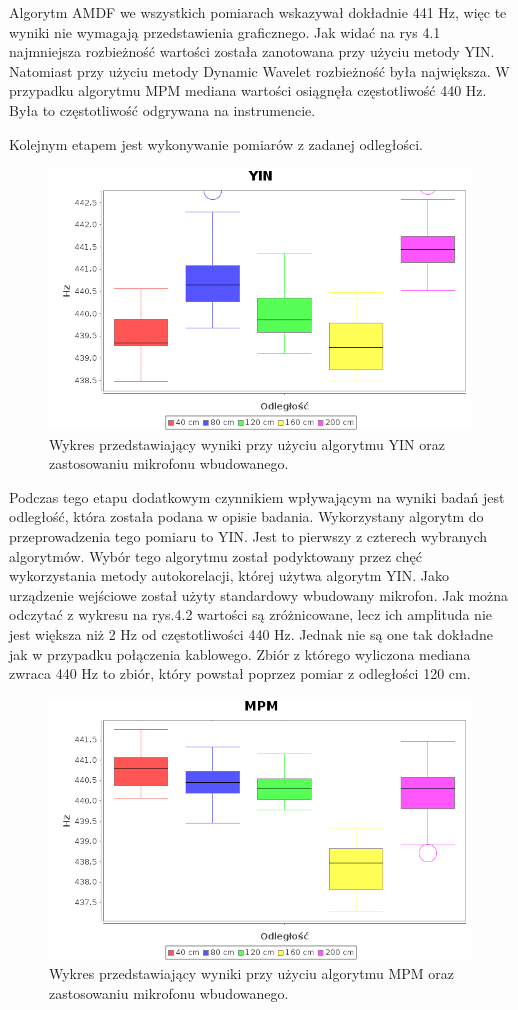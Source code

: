 Algorytm AMDF we wszystkich pomiarach wskazywał dokładnie 441 Hz, więc te wyniki nie wymagają przedstawienia graficznego. Jak widać na rys 4.1 najmniejsza rozbieżność wartości została zanotowana przy użyciu metody YIN. Natomiast przy użyciu metody Dynamic Wavelet rozbieżność była największa. W przypadku algorytmu MPM mediana wartości osiągnęła częstotliwość 440 Hz. Była to częstotliwość odgrywana na instrumencie.
 
 \newpage
Kolejnym etapem jest wykonywanie pomiarów z zadanej odległości.


\begin{figure}[h!]
  \centering
  \includegraphics[width=0.5\linewidth]{rys/BoxPlots/YIN_mic_wb}
  \caption{Wykres przedstawiający wyniki przy użyciu algorytmu YIN oraz zastosowaniu mikrofonu wbudowanego.}
  \label{fig:schemat}
\end{figure}


Podczas tego etapu dodatkowym czynnikiem wpływającym na wyniki badań jest odległość, która została podana w opisie badania. Wykorzystany algorytm do przeprowadzenia tego pomiaru to YIN. Jest to pierwszy z czterech wybranych algorytmów. Wybór tego algorytmu został podyktowany przez chęć wykorzystania metody autokorelacji, której użytwa algorytm YIN. Jako urządzenie wejściowe został użyty standardowy wbudowany mikrofon. Jak można odczytać z wykresu na rys.4.2 wartości są zróżnicowane, lecz ich amplituda nie jest większa niż 2 Hz od częstotliwości 440 Hz. Jednak nie są one tak dokładne jak w przypadku połączenia kablowego. Zbiór z którego wyliczona mediana zwraca 440 Hz to zbiór, który powstał poprzez pomiar z odległości 120 cm.


\begin{figure}[h!]
  \centering
  \includegraphics[width=0.5\linewidth]{rys/BoxPlots/MPM_mic_wb}
  \caption{Wykres przedstawiający wyniki przy użyciu algorytmu MPM oraz zastosowaniu mikrofonu wbudowanego.}
  \label{fig:schemat}
\end{figure}


